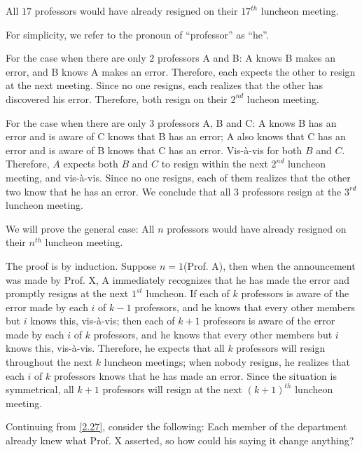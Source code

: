 \begin{solution} %
  All $17$ professors would have already resigned
  on their $17^{th}$ luncheon meeting.
  \par
  For simplicity, we refer
  to the pronoun of ``professor'' as ``he''.
  \par
  \medskip
  For the case when there are only $2$ professors A and B:
  A knows B makes an error, and B knows A makes an error.
  Therefore, each expects the other to resign at the next
  meeting. Since no one resigns, each realizes that the
  other has discovered his error. Therefore, both
  resign on their $2^{nd}$ lucheon meeting.
  \par
  \medskip
  For the case when there are only $3$ professors A, B and
  C: A knows B has an error and is aware of C knows that
  B has an error; A also knows that C has an error and
  is aware of B knows that C has an error. Vis-\`a-vis for
  both $B$ and $C$. Therefore, $A$ expects both $B$ and $C$
  to resign within the next $2^{nd}$ luncheon meeting, and
  vis-\`a-vis. Since no one resigns, each of them realizes
  that the other two know that he has an error. We conclude
  that all $3$ professors resign at the $3^{rd}$ luncheon
  meeting.
  \par
  \medskip
  We will prove the general case: All $n$ professors
  would have already resigned on their $n^{th}$ luncheon
  meeting.
  \par
  The proof is by induction.
  Suppose $n=1$(Prof. A), then when
  the announcement was made by Prof. X, A immediately
  recognizes that he has made the error and promptly
  resigns at the next $1^{st}$ luncheon. If each of
  $k$ professors is aware of the error made by each $i$ of
  $k - 1$ professors, and he knows that every other members
  but $i$ knows this, vis-\`a-vis;
  then each of $k + 1$ professors is
  aware of the error made by each $i$ of $k$ professors,
  and he knows that every other members but $i$ knows this,
  vis-\`a-vis. Therefore, he expects that all $k$ professors
  will resign throughout the next $k$ luncheon meetings;
  when nobody resigns, he realizes
  that each $i$ of $k$ professors knows that he has made
  an error. Since the situation is symmetrical, all $k + 1$
  professors will resign at the next $(k + 1)^{th}$ luncheon
  meeting.
\end{solution}

\begin{pr}[**] \label{2.28} %
  Continuing from \autoref{2.27}, consider the following:
  Each member of the department already knew what Prof. X
  asserted, so how could his saying it change anything?
\end{pr}

